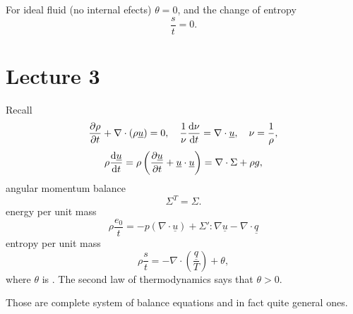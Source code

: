 \documentclass[11pt,oneside]{book}
\renewcommand{\vec}[1]{\underline{#1}}
\theoremstyle{definition} %
\theoremstyle{plain} %
\theoremstyle{remark} %
\theoremstyle{underline}
\begin{document}
  For ideal fluid (no internal efects) $\theta = 0$, and the change of entropy
  \begin{displaymath}
    \dfrac{s}{t} = 0.
  \end{displaymath}


  \chapter{Lecture 3}

  Recall
  \begin{displaymath}
    \ptf{\rho}{t} + \nabla \cdot (\rho \vec u) = 0,  
    \quad \frac{1}{\nu} \dfrac{\nu}{t} = \nabla \cdot \vec u, 
    \quad \nu = \frac{1}{\rho},
  \end{displaymath}
  \begin{displaymath}
    \rho \dfrac{\vec u }{t} = \rho \left(  \ptf{\vec u}{t} + \vec u \cdot \vec u \right) = \nabla \cdot \Sigma  + \rho g,
  \end{displaymath}
  angular momentum balance
  \begin{displaymath}
    \Sigma^T = \Sigma.
  \end{displaymath}
  energy per unit mass
  \begin{displaymath}
    \rho \dfrac{e_0}{t} = - p (\nabla \cdot \vec u) + \Sigma' : \nabla \vec u - \nabla \cdot \vec q
  \end{displaymath}
  entropy per unit mass
  \begin{displaymath}
    \rho \dfrac{s}{t} = - \nabla \cdot \left( \frac{\vec q }{T} \right) + \theta,
  \end{displaymath}
  where $\theta$ is . The second law of thermodynamics says that $\theta > 0 $.

  Those are complete system of balance equations and in fact quite general ones.
\end{document}
